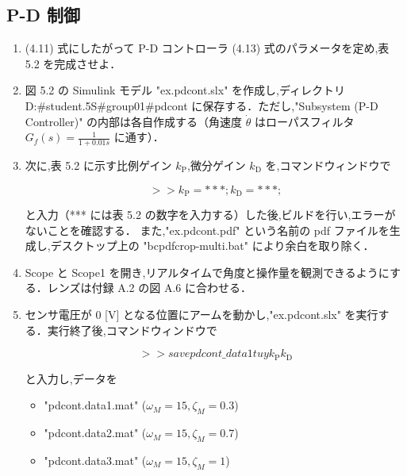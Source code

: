 \subsection{P-D 制御}

\begin{enumerate}
  \item (4.11) 式にしたがって P-D コントローラ (4.13) 式のパラメータを定め,表 5.2 を完成させよ．
        
  \item 図 5.2 の Simulink モデル "ex.pdcont.slx" を作成し,ディレクトリ D:\#student.5S\#group01\#pdcont に保存する．ただし,"Subsystem (P-D Controller)" の内部は各自作成する（角速度 $\dot{\theta}$ はローパスフィルタ $G_f(s) = \frac{1}{1 + 0.01s}$ に通す）．
        
  \item 次に,表 5.2 に示す比例ゲイン $k_{\mathrm{P}}$,微分ゲイン $k_{\mathrm{D}}$ を,コマンドウィンドウで
        
        \begin{equation}
          >> k_{\mathrm{P}} = ***; k_{\mathrm{D}} = ***;
        \end{equation}
        
        と入力（*** には表 5.2 の数字を入力する）した後,ビルドを行い,エラーがないことを確認する．
        また,"ex.pdcont.pdf" という名前の pdf ファイルを生成し,デスクトップ上の 
        "bcpdfcrop-multi.bat" により余白を取り除く．
        
  \item Scope と Scope1 を開き,リアルタイムで角度と操作量を観測できるようにする．レンズは付録 A.2 の図 A.6 に合わせる．
        
  \item センサ電圧が 0 [V] となる位置にアームを動かし,"ex.pdcont.slx" を実行する．実行終了後,コマンドウィンドウで
        
        \begin{equation}
          >> save pdcont\_data1 t u y k_{\mathrm{P}} k_{\mathrm{D}}
        \end{equation}
        
        と入力し,データを
        
        \begin{itemize}
          \item "pdcont.data1.mat" ($\omega_M = 15, \zeta_M = 0.3$)
          \item "pdcont.data2.mat" ($\omega_M = 15, \zeta_M = 0.7$)
          \item "pdcont.data3.mat" ($\omega_M = 15, \zeta_M = 1$)
        \end{itemize}
        

\end{enumerate}
